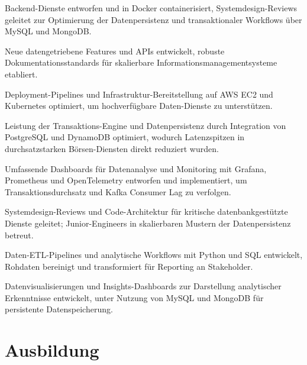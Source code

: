 \documentclass[10pt,a4paper]{resume}
\begin{document}
\bullets
  \item Backend-Dienste entworfen und in Docker containerisiert, Systemdesign-Reviews geleitet zur Optimierung der Datenpersistenz und transaktionaler Workflows über MySQL und MongoDB.
  \item Neue datengetriebene Features und APIs entwickelt, robuste Dokumentationsstandards für skalierbare Informationsmanagementsysteme etabliert.
  \item Deployment-Pipelines und Infrastruktur-Bereitstellung auf AWS EC2 und Kubernetes optimiert, um hochverfügbare Daten-Dienste zu unterstützen.
\bulletsend
\vspace{1.5pt}
\bullets
  \item Leistung der Transaktions-Engine und Datenpersistenz durch Integration von PostgreSQL und DynamoDB optimiert, wodurch Latenzspitzen in durchsatzstarken Börsen-Diensten direkt reduziert wurden.
  \item Umfassende Dashboards für Datenanalyse und Monitoring mit Grafana, Prometheus und OpenTelemetry entworfen und implementiert, um Transaktionsdurchsatz und Kafka Consumer Lag zu verfolgen.
  \item Systemdesign-Reviews und Code-Architektur für kritische datenbankgestützte Dienste geleitet; Junior-Engineers in skalierbaren Mustern der Datenpersistenz betreut.
\bulletsend
\vspace{1.5pt}
\bullets
  \item Daten-ETL-Pipelines und analytische Workflows mit Python und SQL entwickelt, Rohdaten bereinigt und transformiert für Reporting an Stakeholder.
  \item Datenvisualisierungen und Insights-Dashboards zur Darstellung analytischer Erkenntnisse entwickelt, unter Nutzung von MySQL und MongoDB für persistente Datenspeicherung.
\bulletsend
\vspace{1.5pt}

\section{Ausbildung}

\vspace{2pt}
\end{document}
